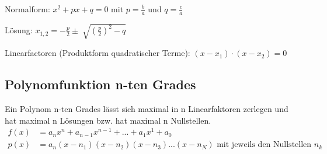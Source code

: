 Normalform:
$ x^2 + px + q = 0 $ mit $p=\frac{b}{a}$ und $q=\frac{c}{a}$

Lösung: $x_{1,2}= - \frac{p}{2} \pm \sqrt[]{( \frac{p}{2})^2 -q }$

Linearfactoren (Produktform quadratischer Terme): $(x-x_1)\cdot (x-x_2 )=0$

\subsection{Polynomfunktion n-ten Grades}
Ein Polynom n-ten Grades lässt sich maximal in n Linearfaktoren zerlegen und hat maximal n Lösungen bzw. hat maximal n Nullstellen.
\begin{align*}
f(x) &= a_nx^n+a_{n-1}x^{n-1}+...+a_1x^1+a_0 \\
p(x) &=a_n(x-n_1)(x-n_2)(x-n_3)...(x-n_N) \textrm{ mit jeweils den Nullstellen } n_k
\end{align*}

